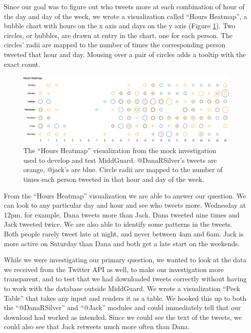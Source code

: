 \documentclass[midd]{thesis}
\begin{document}
Since our goal was to figure out who tweets more at each combination of hour of
the day and day of the week, we wrote a visualization called ``Hours Heatmap'',
a bubble chart with hours on the x axis and days on the y axis (Figure
\ref{fig:punchcard}). Two circles, or bubbles, are drawn at entry in the chart,
one for each person. The circles' radii are mapped to the number of times the
corresponding person tweeted that hour and day. Mousing over a pair of circles
adds a tooltip with the exact count.

\begin{figure}[!ht]
  \centering
  \includegraphics[width=1\textwidth]{punchcard}
  \caption{The ``Hours Heatmap'' visualization from the mock investigation used
  to develop and test MiddGuard. @DanaRSilver's tweets are orange, @jack's are
  blue. Circle radii are mapped to the number of times each person tweeted in
  that hour and day of the week.}
  \label{fig:punchcard}
\end{figure}

From the ``Hours Heatmap'' visualization we are able to answer our question. We
can look to any particular day and hour and see who tweets more. Wednesday at
12pm, for example, Dana tweets more than Jack. Dana tweeted nine times and Jack
tweeted twice. We are also able to identify some patterns in the tweets. Both
people rarely tweet late at night, and never between 4am and 6am. Jack is more
active on Saturday than Dana and both get a late start on the weekends.

While we were investigating our primary question, we wanted to look at the data
we received from the Twitter API as well, to make our investigation more
transparent, and to test that we had downloaded tweets correctly without having
to work with the database outside MiddGuard. We wrote a visualization ``Peek
Table'' that takes any input and renders it as a table. We hooked this up to
both the ``@DanaRSilver'' and ``@Jack'' modules and could immediately tell that
our download had worked as intended. Since we could see the text of the tweets,
we could also see that Jack retweets much more often than Dana.
\end{document}

